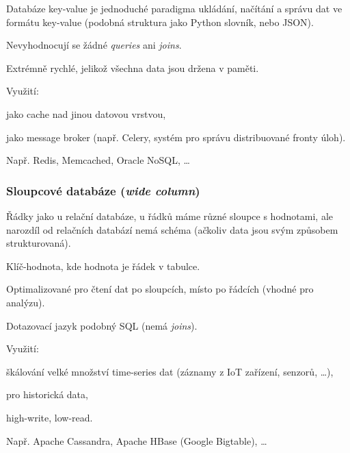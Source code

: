 \begin{compactitem}
    \item Databáze key-value je jednoduché paradigma ukládání, načítání a správu dat ve formátu key-value (podobná struktura jako Python slovník, nebo JSON).
    \item Nevyhodnocují se žádné \textit{queries} ani \textit{joins}.
    \item Extrémně rychlé, jelikož všechna data jsou držena v paměti.
    \item Využití: \begin{compactitem}
        \item jako cache nad jinou datovou vrstvou,
        \item jako message broker (např. Celery, systém pro správu distribuované fronty úloh).
    \end{compactitem}
    \item Např. Redis, Memcached, Oracle NoSQL, \dots
\end{compactitem}

\subsubsection*{Sloupcové databáze (\textit{wide column})}

\begin{compactitem}
    \item Řádky jako u relační databáze, u řádků máme různé sloupce s hodnotami, ale narozdíl od relačních databází nemá schéma (ačkoliv data jsou svým způsobem strukturovaná).
    \item Klíč-hodnota, kde hodnota je řádek v tabulce.
    \item Optimalizované pro čtení dat po sloupcích, místo po řádcích (vhodné pro analýzu).
    \item Dotazovací jazyk podobný SQL (nemá \textit{joins}).
    \item Využití: \begin{compactitem}
        \item škálování velké množství time-series dat (záznamy z IoT zařízení, senzorů, \dots),
        \item pro historická data,
        \item high-write, low-read.
    \end{compactitem}
    \item Např. Apache Cassandra, Apache HBase (Google Bigtable), \dots
\end{compactitem}

